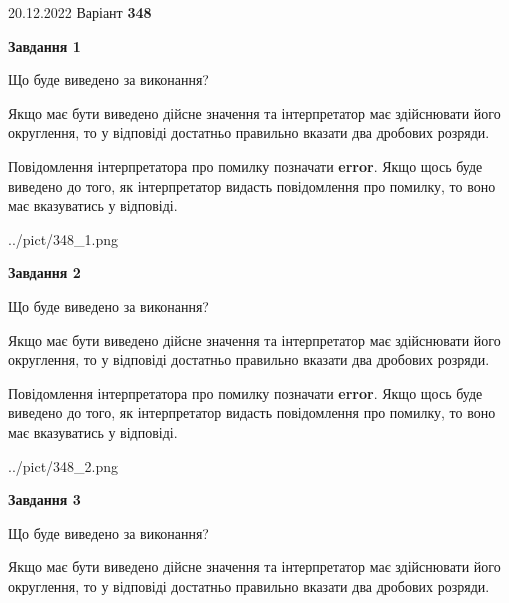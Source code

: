 \documentclass[12pt, ukrainian]{article}
\begin{document}
{20.12.2022 Варіант \No \textbf { 348 }\par}
{
\begin {Large}

{\begin {center}\textbf{Завдання 1}\end {center}}\par
Що буде виведено за виконання? \par

Якщо має бути виведено дійсне значення та інтерпретатор має здійснювати його округлення, 
то у відповіді достатньо правильно вказати два дробових розряди.

Повідомлення інтерпретатора про помилку позначати \textbf{error}.
Якщо щось буде виведено до того, як інтерпретатор видасть повідомлення про помилку, 
то воно має вказуватись у відповіді. \par

\begin{center}
	{../pict/348_1.png}
\end{center}
\newpage

{\begin {center}\textbf{Завдання 2}\end {center}}\par
Що буде виведено за виконання? \par

Якщо має бути виведено дійсне значення та інтерпретатор має здійснювати його округлення, 
то у відповіді достатньо правильно вказати два дробових розряди.

Повідомлення інтерпретатора про помилку позначати \textbf{error}.
Якщо щось буде виведено до того, як інтерпретатор видасть повідомлення про помилку, 
то воно має вказуватись у відповіді. \par

\begin{center}
	{../pict/348_2.png}
\end{center}
\newpage

{\begin {center}\textbf{Завдання 3}\end {center}}\par
Що буде виведено за виконання? \par

Якщо має бути виведено дійсне значення та інтерпретатор має здійснювати його округлення, 
то у відповіді достатньо правильно вказати два дробових розряди.


\end{Large}}
\end{document}
